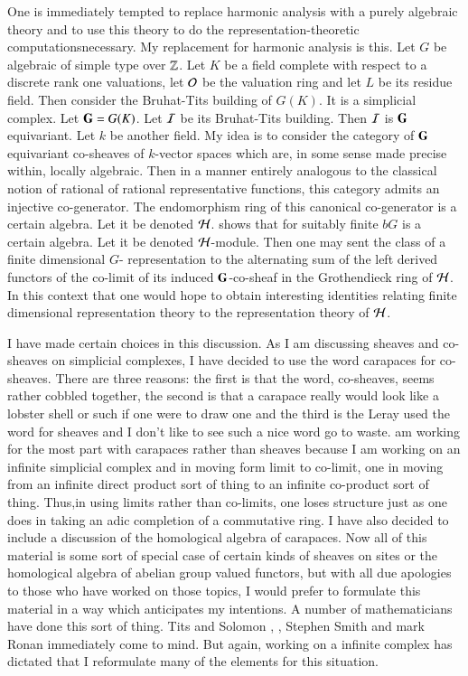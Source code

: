 One is immediately tempted to replace harmonic analysis with a purely algebraic theory and to use this theory to do the representation-theoretic computations\pageoriginale necessary. My replacement for harmonic analysis is this. Let $G$ be algebraic of simple type over $\mathbb{Z}$. Let $K$ be a field complete with respect to a discrete rank one valuations, let $\mathcal{O}$ be the valuation ring and let $L$ be its residue field. Then consider the Bruhat-Tits building of $G(K)$. It is a simplicial complex. Let $\mathbf{G} =G(K)$. Let $\mathcal{I}$ be its Bruhat-Tits building. Then $\mathcal{I}$ is $\mathbf{G}$ equivariant. Let $k$ be another field. My idea is to consider the category of $\mathbf{G}$ equivariant co-sheaves of $k$-vector spaces which are, in some sense made precise within, locally algebraic. Then in a manner entirely analogous to the classical notion of rational of rational representative functions, this category admits an injective co-generator. The endomorphism ring of this canonical co-generator is a certain algebra. Let it be denoted $\mathcal{H}$. \cite{chap6-keyT} shows that for suitably finite $bG$ is a certain algebra. Let it be denoted $\mathcal{H}$-module. Then one may sent the class of a finite dimensional $G$- representation to the alternating sum of the left derived functors of the co-limit of its induced $\mathbf{G}$-co-sheaf in the Grothendieck ring of $\mathcal{H}$. In this context that one would hope to obtain interesting identities relating finite dimensional representation theory to the representation theory of $\mathcal{H}$.

I have made certain choices in this discussion. As I am discussing sheaves and co-sheaves on simplicial complexes, I have decided to use the word carapaces for co-sheaves. There are three reasons: the first is that the word, co-sheaves, seems rather cobbled together, the second is that a carapace really would look like a lobster shell or such if one were to draw one and the third is the Leray used the word for sheaves and I don't like to see such a nice word go to waste.  am working for the most part with carapaces rather than sheaves because I am working on an infinite simplicial complex and in moving form limit to co-limit, one in moving from an infinite direct product sort of thing to an infinite co-product sort of thing. Thus,in using limits rather than co-limits, one loses structure just as one does in taking an adic completion of a commutative ring. I have also decided to include a discussion of the homological algebra of carapaces. Now all of this material is some sort of special case of certain kinds of sheaves on sites or the homological algebra of abelian group valued functors, but with all due apologies to those who have worked on those topics, I would prefer to formulate this material in a way which anticipates my intentions. A number of mathematicians have done this sort of thing. Tits and Solomon \cite{chap6-keyS}, \cite{chap6-keyT}, Stephen Smith and mark Ronan \cite{chap6-keyRS} immediately come to mind. But again, working on a infinite complex has dictated that I reformulate many of the elements for this situation.

